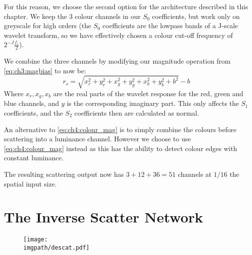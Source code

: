For this reason, we choose the second option for the
architecture described in this chapter. We keep the 3 colour
channels in our $S_0$ coefficients, but work only on greyscale for high orders 
(the $S_0$ coefficients are the lowpass bands of a J-scale wavelet transform, so
we have effectively chosen a colour cut-off frequency of $2^{-J} \frac{f_s}{2}$).

We combine the three channels by modifying our magnitude operation from \eqref{eq:ch3:magbias} 
to now be:
\begin{equation}\label{eq:ch4:colour_mag}
 r_s = \sqrt{x_r^2 + y_r^2 + x_g^2 + y_g^2 + x_b^2 + y_b^2 + b^2} - b
\end{equation}
Where $x_r, x_g, x_b$ are the real parts of the wavelet response for the red,
green and blue channels, and $y$ is the corresponding imaginary part. This only
affects the $S_1$ coefficients, and the $S_2$ coefficients then are calculated
as normal. 

An alternative to \eqref{eq:ch4:colour_mag} is to simply combine the colours
before scattering into a luminance channel. However we choose to use \eqref{eq:ch4:colour_mag}
instead as this has the ability to detect colour edges with constant luminance.

The resulting scattering output now has $3 + 12 + 36 = 51$ channels at $1/16$ the
spatial input size.

\section{The Inverse Scatter Network}\label{sec:ch4:descatternet}
\begin{figure}[t]
  \centering
  \texttt{[image: \\imgpath/descat.pdf]}
  \label{fig:ch4:descat}
\end{figure}

